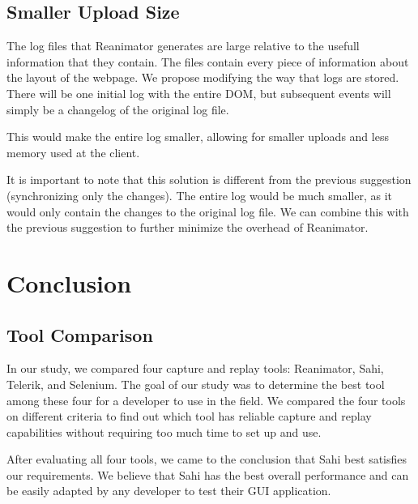 \documentclass[12pt,journal]{IEEEtran}
\begin{document}
\subsection{Smaller Upload Size}
The log files that Reanimator generates are large relative to the usefull information that they contain. The files contain every piece of information about the layout of the webpage. We propose modifying the way that logs are stored. There will be one initial log with the entire DOM, but subsequent events will simply be a changelog of the original log file.
\par
This would make the entire log smaller, allowing for smaller uploads and less memory used at the client.
\par
It is important to note that this solution is different from the previous suggestion (synchronizing only the changes). The entire log would be much smaller, as it would only contain the changes to the original log file. We can combine this with the previous suggestion to further minimize the overhead of Reanimator.

\section{Conclusion}
\subsection{Tool Comparison}
In our study, we compared four capture and replay tools: Reanimator, Sahi, Telerik, and Selenium. The goal of our study was to determine the best tool among these four for a developer to use in the field. We compared the four tools on different criteria to find out which tool has reliable capture and replay capabilities without requiring too much time to set up and use.
\par
After evaluating all four tools, we came to the conclusion that Sahi best satisfies our requirements. We believe that Sahi has the best overall performance and can be easily adapted by any developer to test their GUI application.
\end{document}
